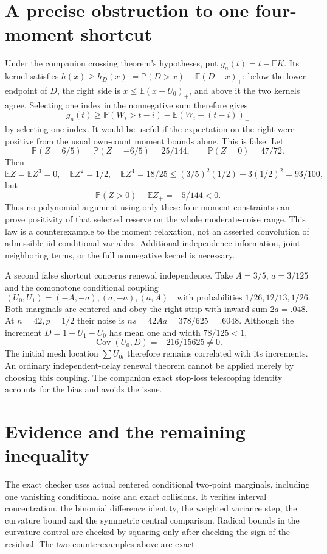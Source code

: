 \documentclass[11pt,a4paper]{article}
\newcommand{\E}{\mathbb E}\newcommand{\Pp}{\mathbb P}
\begin{document}
\section{A precise obstruction to one four-moment shortcut}
Under the companion crossing theorem's hypotheses, put
$g_n(t)=t-\E K$. Its kernel satisfies
$h(x)\ge h_D(x):=\Pp(D>x)-\E(D-x)_+$: below the lower endpoint of
$D$, the right side is $x\le\E(x-U_0)_+$, and above it the two
kernels agree. Selecting one index in the nonnegative sum therefore gives
\[
 g_n(t)\ge\Pp(W_i>t-i)-\E(W_i-(t-i))_+
\]
by selecting one index. It would be useful if the expectation on the right
were positive from the usual own-count moment bounds alone. This is false.
Let
\[
 \Pp(Z=6/5)=\Pp(Z=-6/5)=25/144,
                 \qquad\Pp(Z=0)=47/72.
\]
Then
\[
 \E Z=\E Z^3=0,\quad \E Z^2=1/2,\quad\E Z^4=18/25
       \le(3/5)^2(1/2)+3(1/2)^2=93/100,
\]
but
\[
                   \Pp(Z>0)-\E Z_+=-5/144<0.
\]
Thus no polynomial argument using only these four moment constraints can
prove positivity of that selected reserve on the whole moderate-noise
range. This law is a counterexample to the moment relaxation, not an
asserted convolution of admissible iid conditional variables. Additional
independence information, joint neighboring terms, or the full nonnegative
kernel is necessary.

A second false shortcut concerns renewal independence. Take $A=3/5$,
$a=3/125$ and the comonotone conditional coupling
\[
 (U_0,U_1)=(-A,-a),(a,-a),(a,A)
       \quad\text{with probabilities }1/26,12/13,1/26.
\]
Both marginals are centered and obey the right strip with inward sum
$2a=.048$. At $n=42,p=1/2$ their noise is
$ns=42Aa=378/625=.6048$. Although the increment
$D=1+U_1-U_0$ has mean one and width $78/125<1$,
\[
                      \operatorname{Cov}(U_0,D)=-216/15625\ne0.
\]
The initial mesh location $\sum U_{0i}$ therefore remains correlated
with its increments. An ordinary independent-delay renewal theorem cannot
be applied merely by choosing this coupling. The companion exact
stop-loss telescoping identity accounts for the bias and avoids the issue.

\section{Evidence and the remaining inequality}
The exact checker uses actual centered conditional two-point marginals,
including one vanishing conditional noise and exact collisions. It verifies
interval concentration, the binomial difference identity, the weighted
variance step, the curvature bound and the symmetric central comparison.
Radical bounds in the curvature control are checked by squaring only after
checking the sign of the residual. The two counterexamples above are exact.
\end{document}
